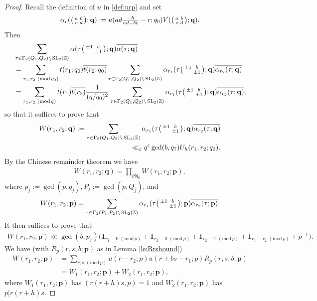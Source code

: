 \documentclass[12pt]{amsart}
\theoremstyle{definition}
\theoremstyle{remark}
\numberwithin{equation}{section}
\newcommand{\Z}{{\mathbb Z}}
\newcommand{\1}{{\mathbf 1}}
\newcommand{\eps}{\varepsilon}
\newcommand{\SL}{\operatorname{SL}_2}
\renewcommand{\c}{\mathfrak c}
\renewcommand{\pmod}[1]{\,\,(\mathrm{mod}\,{#1})}
\begin{document}
\begin{proof}
Recall the definition of $u$ in \eqref{def:urp} and set
\begin{align*}
    \alpha_r(\smqty(a & b \\ c & d);\mathbf{q}) := u(ad\tfrac{-h}{ad-bc}-r;q_0)  V(\smqty(a & b \\c & d);\mathbf{q}).
\end{align*}
Then
\begin{align*}
     &\sum_{\tau \in \Gamma_2(Q_1,Q_2) \backslash \SL(\Z)} \alpha(\tau \smqty(\pm 1 & b \\  & \pm 1) ;\mathbf{q}) \overline{\alpha (\tau;\mathbf{q})}  \\
     &= \sum_{r_1,r_2 \pmod{q_0}} t(r_1;q_0) \overline{t(r_2;q_0)}    \sum_{\tau \in \Gamma_2(Q_1,Q_2)  \backslash \SL(\Z)} \alpha_{r_1}(\tau \smqty(\pm 1& b \\  & \pm 1);\mathbf{q}) \overline{\alpha_{r_2} (\tau;\mathbf{q})} \\
     &=  \sum_{r_1,r_2 \pmod{q}} t(r_1) \overline{t(r_2)}  \frac{1}{(q/q_0)^2}  \sum_{\tau \in \Gamma_2(Q_1,Q_2)  \backslash \SL(\Z)} \alpha_{r_1}(\tau \smqty(\pm 1& b \\  & \pm 1) ;\mathbf{q}) \overline{\alpha_{r_2} (\tau;\mathbf{q})},
\end{align*}
so that it suffices to prove that
\begin{align*}
W(r_1,r_2;\mathbf{q}) := \sum_{\tau \in \Gamma_2(Q_1,Q_2)  \backslash \SL(\Z)} \alpha_{r_1}(\tau \smqty(\pm 1 & b \\  & \pm 1) ;\mathbf{q}) \overline{\alpha_{r_2} (\tau;\mathbf{q})}    
 \\
 \ll_\eps  q^\eps \gcd(b,q_7)  U_h(r_1,r_2;q_0). 
\end{align*}
By the Chinese remainder theorem we have
\begin{align*}
W(r_1,r_2;\mathbf{q})  = \prod_{p|q_0} W(r_1,r_2;\mathbf{p}), 
\end{align*}
where $p_j:=\gcd(p,q_j),P_j:=\gcd(p,Q_j)$, and
\begin{align*}
    W(r_1,r_2;\mathbf{p}) = \sum_{\tau \in \Gamma_2(P_1,P_2)  \backslash \SL(\Z)} \alpha_{r_1}(\tau \smqty(\pm 1 & b \\  & \pm 1) ;\mathbf{p}) \overline{\alpha_{r_2} (\tau;\mathbf{p})} .
\end{align*}
It then suffices to prove that
\begin{align*}
  W(r_1,r_2;\mathbf{p}) \ll \gcd(b,p_7) \bigg( \mathbf{1}_{r_1\equiv 0 \pmod{p}} + \mathbf{1}_{r_2\equiv 0 \pmod{p}} + \mathbf{1}_{r_2\equiv 1 \pmod{p}} + \mathbf{1}_{r_1 \equiv r_2 \pmod{p}} + p^{-1} \bigg).
\end{align*}
We have (with $R_p(r,s,b;\mathbf{p})$ as in Lemma \ref{le:Rrsbound})
 \begin{align*} 
       W(r_1,r_2;\mathbf{p}) 
      & = \sum_{r,s \pmod{p}}u(r-r_2;p) u(r+bs-r_1;p) R_p(r,s,b;\mathbf{p}) \\
      & =W_1(r_1,r_2;\mathbf{p}) +W_2(r_1,r_2;\mathbf{p}),
   \end{align*}
   where $W_1(r_1,r_2;\mathbf{p})$ has $(r(r+h)s,p)=1$ and $W_2(r_1,r_2;\mathbf{p})$ has $p| r(r+h)s$.
  

\end{proof}
\end{document}
